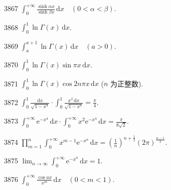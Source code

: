 \begin{prob}[S]{3867}
$\displaystyle \int_0^{+\infty} \frac{\sinh\alpha x}{\sinh\beta x} \,\mathrm{d}x \quad (0<\alpha<\beta)$.
\end{prob}

\begin{prob}[S]{3868}
$\displaystyle \int_0^1 \ln\Gamma(x) \,\mathrm{d}x$.
\end{prob}

\begin{prob}[S]{3869}
$\displaystyle \int_a^{a+1} \ln\Gamma(x) \,\mathrm{d}x \quad (a>0)$.
\end{prob}

\begin{prob}[S]{3870}
$\displaystyle \int_0^1 \ln\Gamma(x)\sin\pi x \,\mathrm{d}x$.
\end{prob}

\begin{prob}[S]{3871}
$\displaystyle \int_0^1 \ln\Gamma(x)\cos 2n\pi x \,\mathrm{d}x$ ($n$ 为正整数).
\end{prob}


\begin{prob}[M]{3872}
$\displaystyle \int_0^1 \frac{\mathrm{d}x}{\sqrt{1-x^4}} \cdot \int_0^1 \frac{x^2\,\mathrm{d}x}{\sqrt{1-x^4}} = \frac{\pi}{4}$.
\end{prob}

\begin{prob}[M]{3873}
$\displaystyle \int_0^{+\infty} \mathrm{e}^{-x^4}\,\mathrm{d}x \cdot \int_0^{+\infty} x^2\mathrm{e}^{-x^4}\,\mathrm{d}x = \frac{\pi}{8\sqrt{2}}$.
\end{prob}

\begin{prob}[M]{3874}
$\displaystyle \prod_{m=1}^{n} \int_0^{+\infty} x^{m-1}\mathrm{e}^{-x^n}\,\mathrm{d}x = \left(\frac{1}{n}\right)^{n+\frac{1}{2}} (2\pi)^{\frac{n-1}{2}}$.
\end{prob}

\begin{prob}[M]{3875}
$\displaystyle \lim_{n\to\infty} \int_0^{+\infty} \mathrm{e}^{-x^n}\,\mathrm{d}x = 1$.
\end{prob}


\begin{prob}[S]{3876}
$\displaystyle \int_0^{+\infty} \frac{\cos ax}{x^m}\,\mathrm{d}x \quad (0<m<1)$.
\end{prob}

